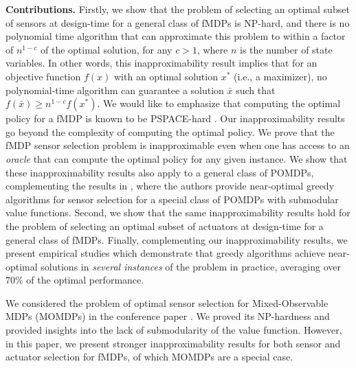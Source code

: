 \documentclass[twocolumn]{autart}    %
\begin{document}
\noindent \textbf{Contributions.}
 {Firstly, we show that the problem of selecting an optimal subset of sensors at design-time for a general class of  fMDPs is NP-hard, and there is no polynomial time algorithm that can approximate this problem to within a factor of $n^{1-c}$ of the optimal solution, for any $c>1$, where $n$ is the number of state variables. In other words, this inapproximability result implies that for an objective function $f(x)$ with an optimal solution $x^*$ (i.e., a maximizer), no polynomial-time algorithm can guarantee a solution $\bar{x}$ such that $f(\bar{x}) \ge n^{1-c} f(x^*).$  We would like to emphasize that computing the optimal policy for a fMDP is known to be PSPACE-hard \cite{papadimitriou1987complexity}. Our inapproximability results go beyond the complexity of computing the optimal policy. We prove that the fMDP sensor selection problem is inapproximable even when one has access to an \textit{oracle} that can compute the optimal policy for any given instance. We show that these inapproximability results also apply to a general class of POMDPs, complementing the results in \cite{krause2008optimizing}, where the authors provide near-optimal greedy algorithms for sensor selection for a special class of POMDPs with submodular value functions. Second, we show that the same inapproximability results hold for the problem of selecting an optimal subset of actuators at design-time for a general class of  fMDPs.  Finally, complementing our inapproximability results, we present empirical studies which demonstrate that greedy algorithms achieve near-optimal solutions in {\it several instances} of the problem in practice, averaging over $70\%$ of the optimal performance.}




 


We considered the problem of optimal sensor selection for Mixed-Observable MDPs (MOMDPs) in the conference paper \cite{bhargav2023complexity}. We proved its NP-hardness and provided insights into the lack of submodularity of the value function. However, in this paper, we present stronger inapproximability results for both sensor and actuator selection for fMDPs, of which MOMDPs are a special case.  
\end{document}
